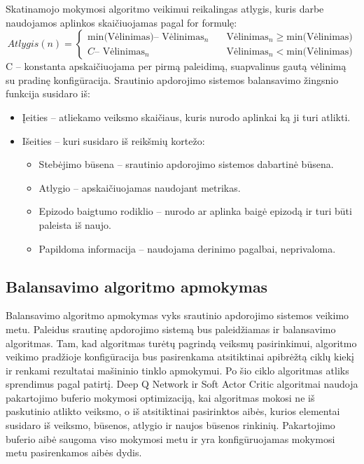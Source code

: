 \documentclass{VUMIFPSbakalaurinis}
\begin{document}
Skatinamojo mokymosi algoritmo veikimui reikalingas atlygis, kuris darbe naudojamos aplinkos skaičiuojamas pagal for
formulę:
\[ Atlygis(n) =
\begin{cases}
    \text{min(Vėlinimas)} – \text{ Vėlinimas}_n  & \quad \text{Vėlinimas}_n \geq \text{min(Vėlinimas)}\\
    C – \text{ Vėlinimas}_n  & \quad \text{Vėlinimas}_n < \text{min(Vėlinimas)}
\end{cases}
\]
C – konstanta apskaičiuojama per pirmą paleidimą, suapvalinus gautą vėlinimą su pradinę konfigūracija. \newline
Srautinio apdorojimo sistemos balansavimo žingsnio funkcija susidaro iš:
\begin{itemize}
 \item Įeities – atliekamo veiksmo skaičiaus, kuris nurodo aplinkai ką ji turi atlikti.
 \item Išeities – kuri susidaro iš reikšmių kortežo:
 \begin{itemize}
    \item Stebėjimo būsena – srautinio apdorojimo sistemos dabartinė būsena.
    \item Atlygio – apskaičiuojamas naudojant metrikas.
    \item Epizodo baigtumo rodiklio – nurodo ar aplinka baigė epizodą ir turi būti paleista iš naujo.
    \item Papildoma informacija – naudojama derinimo pagalbai, neprivaloma.
 \end{itemize}
\end{itemize}

\subsection{Balansavimo algoritmo apmokymas}

Balansavimo algoritmo apmokymas vyks srautinio apdorojimo sistemos veikimo metu. Paleidus srautinę apdorojimo sistemą bus paleidžiamas ir balansavimo algoritmas. Tam, kad algoritmas turėtų pagrindą veiksmų pasirinkimui, algoritmo veikimo pradžioje konfigūracija bus pasirenkama atsitiktinai apibrėžtą ciklų kiekį ir renkami rezultatai mašininio tinklo apmokymui. Po šio ciklo algoritmas atliks sprendimus pagal patirtį. Deep Q Network ir Soft Actor Critic algoritmai naudoja pakartojimo buferio mokymosi optimizaciją, kai algoritmas mokosi ne iš paskutinio atlikto veiksmo, o iš atsitiktinai pasirinktos aibės, kurios elementai susidaro iš veiksmo, būsenos, atlygio ir naujos būsenos rinkinių. Pakartojimo buferio aibė saugoma viso mokymosi metu ir yra konfigūruojamas mokymosi metu pasirenkamos aibės dydis. 
\end{document}

